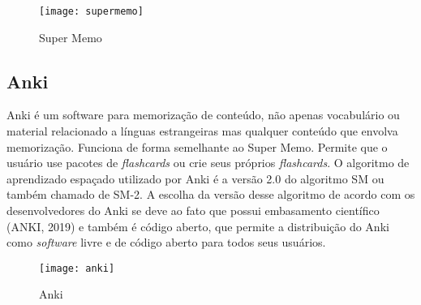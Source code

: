 \begin{figure}[H]
	\caption{\label{fig:supermemo}Super Memo}
	\begin{center}
		\texttt{[image: supermemo]}
	\end{center}
\end{figure}

\subsection{Anki}
Anki é um software para memorização de conteúdo, não apenas vocabulário ou material relacionado a línguas estrangeiras mas qualquer conteúdo que envolva memorização. Funciona de forma semelhante ao Super Memo. Permite que o usuário use pacotes de \textit{flashcards} ou crie seus próprios \textit{flashcards}. O algoritmo de aprendizado espaçado utilizado por Anki é a versão 2.0 do algoritmo SM ou também chamado de SM-2. A escolha da versão desse algoritmo de acordo com os desenvolvedores do Anki se deve ao fato que possui embasamento científico (ANKI, 2019) e também é código aberto, que permite a distribuição do Anki como \textit{software} livre e de código aberto para todos seus usuários.

\begin{figure}[H]
	\caption{\label{fig:anki}Anki}
	\begin{center}
		\texttt{[image: anki]}
	\end{center}
\end{figure}


